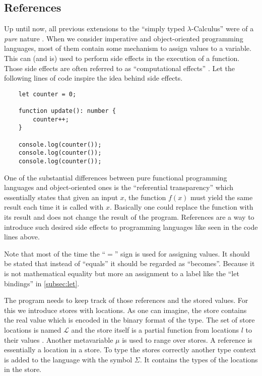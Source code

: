 \subsection{References}

Up until now, all previous extensions to the ``simply
typed $\lambda$-Calculus'' were of a \textit{pure} nature \cite{pierce2002ProgLang}.
When we consider imperative and object-oriented programming languages,
most of them contain some mechanism to assign values to a variable.
This can (and is) used to perform side effects in the execution
of a function. Those side effects are often referred to as 
``computational effects'' \cite{pierce2002ProgLang}. Let the
following lines of code inspire the idea behind side effects.

\begin{verbatim}
    let counter = 0;

    function update(): number {
        counter++;
    }

    console.log(counter());
    console.log(counter());
    console.log(counter());
\end{verbatim}

One of the substantial differences between pure functional programming
languages and object-oriented ones is the ``referential transparency''
which essentially states that given an input $x$, the function $f(x)$
must yield the same result each time it is called with $x$. Basically
one could replace the function with its result and does not change
the result of the program. References are a way to introduce such
desired side effects to programming languages like seen in the
code lines above.

Note that most of the time the ``$=$'' sign is used for assigning values. It should be
stated that instead of ``equals'' it should be regarded as ``becomes''.
Because it is not mathematical equality but more an assignment
to a label like the ``let bindings'' in \ref{subsec:let}.

The program needs to keep track of those references and the stored values.
For this we introduce stores with locations.
As one can imagine, the store contains the real value which is encoded
in the binary format of the type. The set of store locations is named $\mathcal{L}$
and the store itself is a partial function from locations $l$ to their values
\cite{pierce2002ProgLang}. Another metavariable $\mu$ is used to range
over stores. A reference is essentially a location in a store.
To type the stores correctly another type context is added to the language
with the symbol $\Sigma$. It contains the types of the locations in the store.

